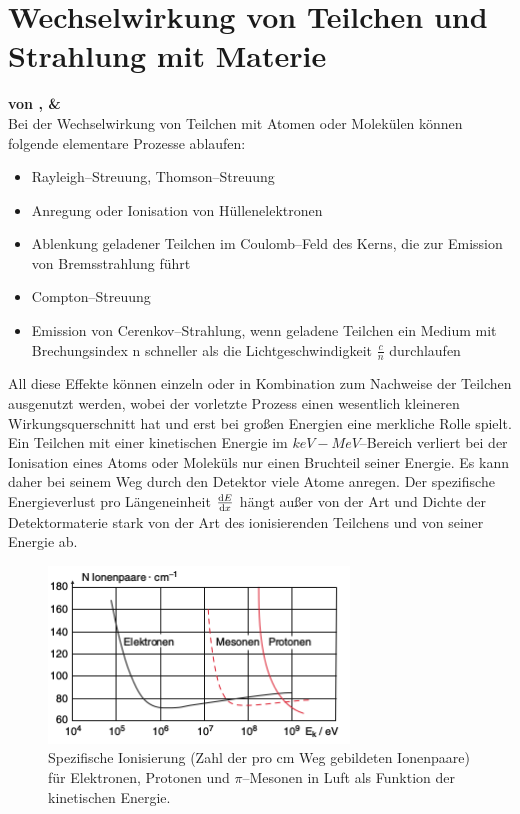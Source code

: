 \documentclass[Ex4_Zusammenfassung.tex]{subfiles}
\begin{document}
\chapter{Wechselwirkung von Teilchen und Strahlung mit Materie}
\textbf{von \anton, \soeren \& \chris}\\

Bei der Wechselwirkung von Teilchen mit Atomen oder Molekülen können folgende elementare Prozesse ablaufen:
\begin{itemize}
	\item Rayleigh--Streuung, Thomson--Streuung
	\item Anregung oder Ionisation von Hüllenelektronen
	\item Ablenkung geladener Teilchen im Coulomb--Feld des Kerns, die zur Emission von Bremsstrahlung führt
	\item Compton--Streuung
	\item Emission von Cerenkov--Strahlung, wenn geladene Teilchen ein Medium mit Brechungsindex n schneller als die Lichtgeschwindigkeit $\frac{c}{n}$ durchlaufen
\end{itemize}
All diese Effekte können einzeln oder in Kombination zum Nachweise der Teilchen ausgenutzt werden, wobei der vorletzte Prozess einen wesentlich kleineren Wirkungsquerschnitt hat und erst bei großen Energien eine merkliche Rolle spielt.
Ein Teilchen mit einer kinetischen Energie im $\si{keV}-\si{MeV}$--Bereich verliert bei der Ionisation eines Atoms oder Moleküls nur einen Bruchteil seiner Energie. Es kann daher bei seinem Weg durch den Detektor viele Atome anregen. Der spezifische Energieverlust pro Längeneinheit $\frac{\mathrm{d} E}{\mathrm{d} x}$ hängt außer von der Art und Dichte der Detektormaterie stark von der Art des ionisierenden Teilchens und von seiner Energie ab.

\begin{figure}[H]
	\centering
	\includegraphics[width=8cm]{Ionisationsplot2.png}
	\caption{Spezifische Ionisierung (Zahl der pro cm Weg gebildeten Ionenpaare) für Elektronen, Protonen und $\pi$--Mesonen in Luft als Funktion der kinetischen Energie.}
\end{figure}
\end{document}
